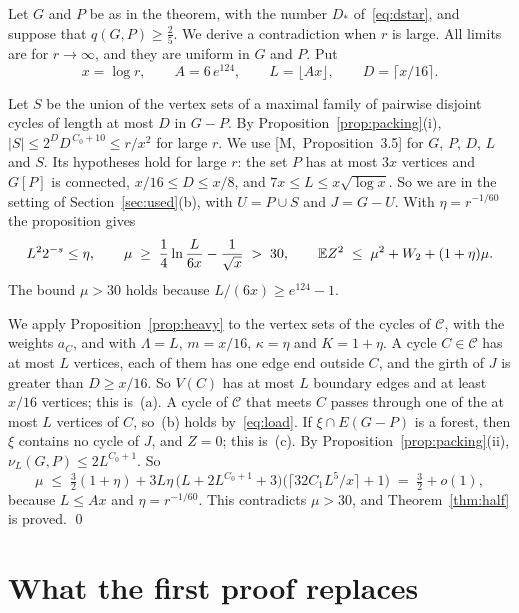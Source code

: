 \documentclass[11pt]{article}
\newcommand{\M}[1]{[M,~#1]}
\begin{document}
Let $G$ and $P$ be as in the theorem, with the number $D_*$ of~\eqref{eq:dstar}, and suppose that
$q(G,P)\ge\frac25$. We derive a contradiction when $r$ is large. All limits are for
$r\to\infty$, and they are uniform in $G$ and $P$. Put
\[
  x=\log r,\qquad A=6\,e^{124},\qquad L=\lfloor Ax\rfloor,\qquad D=\lceil x/16\rceil .
\]

 Let $S$ be the union of the vertex sets of a maximal family of
pairwise disjoint cycles of length at most $D$ in $G-P$. By
Proposition~\ref{prop:packing}(i), $|S|\le2^{D}D^{\,C_0+10}\le r/x^{2}$ for large $r$. We use
\M{Proposition~3.5} for $G$, $P$, $D$, $L$ and $S$. Its hypotheses hold for large $r$: the set
$P$ has at most $3x$ vertices and $G[P]$ is connected, $x/16\le D\le x/8$, and
$7x\le L\le x\sqrt{\log x}$. So we are in the setting of Section~\ref{sec:used}(b), with
$U=P\cup S$ and $J=G-U$. With $\eta=r^{-1/60}$ the proposition gives
\[
  L^{2}2^{-s}\le\eta,\qquad \mu\;\ge\;\frac14\ln\frac{L}{6x}-\frac1{\sqrt x}\;>\;30,\qquad
  \mathbb{E} Z^{2}\;\le\;\mu^{2}+W_2+(1+\eta)\mu .
\]
The bound $\mu>30$ holds because $L/(6x)\ge e^{124}-1$.

 We apply Proposition~\ref{prop:heavy} to the vertex sets of the cycles
of $\mathcal C$, with the weights $a_C$, and with $\Lambda=L$, $m=x/16$, $\kappa=\eta$ and
$K=1+\eta$. A cycle $C\in\mathcal C$ has at most $L$ vertices, each of them has one edge end
outside $C$, and the girth of $J$ is greater than $D\ge x/16$. So $V(C)$ has at most $L$ boundary
edges and at least $x/16$ vertices; this is~(a). A cycle of $\mathcal C$ that meets $C$ passes
through one of the at most $L$ vertices of $C$, so~(b) holds by~\eqref{eq:load}. If
$\xi\cap E(G-P)$ is a forest, then $\xi$ contains no cycle of $J$, and $Z=0$; this is~(c). By
Proposition~\ref{prop:packing}(ii), $\nu_L(G,P)\le2L^{C_0+1}$. So
\[
  \mu\;\le\;\tfrac32(1+\eta)+3L\eta\,\bigl(L+2L^{C_0+1}+3\bigr)
  \bigl(\lceil32C_1L^{5}/x\rceil+1\bigr)\;=\;\tfrac32+o(1),
\]
because $L\le Ax$ and $\eta=r^{-1/60}$. This contradicts $\mu>30$, and
Theorem~\ref{thm:half} is proved. \qed

\section{What the first proof replaces}\label{sec:replaces}
\end{document}
